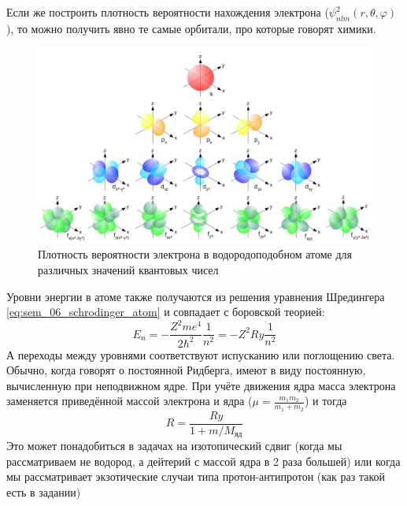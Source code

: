 \documentclass[12pt]{article}
\begin{document}
Если же построить плотность вероятности нахождения электрона ($\psi^2_{nlm}(r, \theta, \varphi)$), то можно получить явно те самые орбитали, про которые говорят химики.
\begin{figure}[h]
    \centering
    \includegraphics[width=\textwidth,height=\textheight,keepaspectratio]{Seminar_06/pics/Pic_03.jpg}
    \caption{Плотность вероятности электрона в водородоподобном атоме для различных значений квантовых чисел}
    \label{fig:sem_04_H_energy_levels}
\end{figure}
Уровни энергии в атоме также получаются из решения уравнения Шредингера \ref{eq:sem_06_schrodinger_atom} и совпадает с боровской теорией:
\begin{equation}
   E_n = -\dfrac{Z^2me^4}{2\hbar^2} \dfrac{1}{n^2} = -Z^2 Ry\dfrac{1}{n^2}
\end{equation}
А переходы между уровнями соответствуют испусканию или поглощению света. Обычно, когда говорят о постоянной Ридберга, имеют в виду постоянную, вычисленную при неподвижном ядре. При учёте движения ядра масса электрона заменяется приведённой массой электрона и ядра ($\mu = \frac{m_1 m_2}{m_1+m_2}$) и тогда
\begin{equation*}
    R=\dfrac{Ry}{1+m/M_{\text{яд}}}
\end{equation*}
Это может понадобиться в задачах на изотопический сдвиг (когда мы рассматриваем не водород, а дейтерий с массой ядра в 2 раза большей) или когда мы рассматривает экзотические случаи типа протон-антипротон (как раз такой есть в задании)
\\
\end{document}

